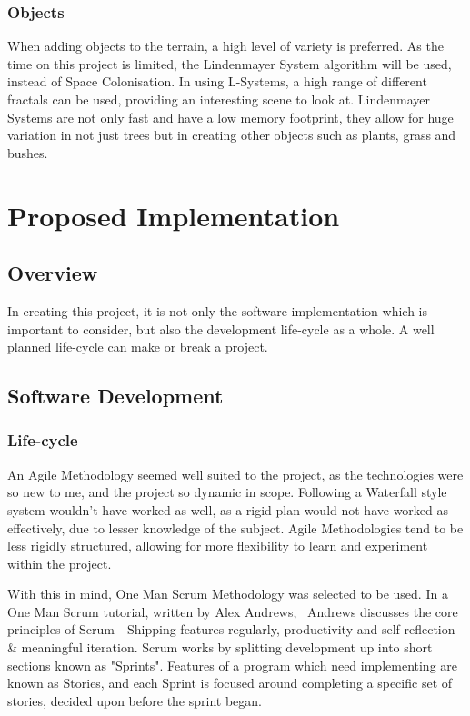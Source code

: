 \documentclass[a4paper,10pt]{report}
\begin{document}
\subsubsection{Objects}

When adding objects to the terrain, a high level of variety is preferred. As the time on this project is limited, the Lindenmayer System algorithm will be used, instead of Space Colonisation. In using L-Systems, a high range of different fractals can be used, providing an interesting scene to look at. Lindenmayer Systems are not only fast and have a low memory footprint, they allow for huge variation in not just trees but in creating other objects such as plants, grass and bushes. 

\section{Proposed Implementation}
\subsection{Overview}

In creating this project, it is not only the software implementation which is important to consider, but also the development life-cycle as a whole. A well planned life-cycle can make or break a project. 

\subsection{Software Development}
\subsubsection{Life-cycle}

An Agile Methodology seemed well suited to the project, as the technologies were so new to me, and the project so dynamic in scope. Following a Waterfall style system wouldn't have worked as well, as a rigid plan would not have worked as effectively, due to lesser knowledge of the subject. Agile Methodologies tend to be less rigidly structured, allowing for more flexibility to learn and experiment within the project. \medskip

With this in mind, One Man Scrum Methodology was selected to be used. In a One Man Scrum tutorial, written by Alex Andrews,~\cite{andrews_2017} Andrews discusses the core principles of Scrum - Shipping features regularly, productivity and self reflection \& meaningful iteration. Scrum works by splitting development up into short sections known as "Sprints". Features of a program which need implementing are known as Stories, and each Sprint is focused around completing a specific set of stories, decided upon before the sprint began. \medskip
\end{document}
